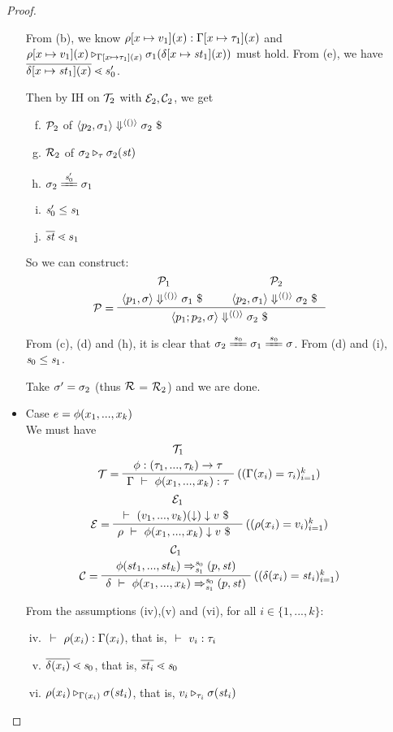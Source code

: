 \begin{proof}
\begin{itemize}
From (b), we know $\rho[x \mapsto v_1](x) : \Gamma[x \mapsto \tau_1](x)$ and  $\rho[x \mapsto v_1](x) \triangleright_{\Gamma[x \mapsto \tau_1](x)} \sigma_1(\delta[x \mapsto \mathit{st}_1](x))$ must hold. 
From (e), we have $\ol{\delta[\Map{x}{\st_1}](x)} \.< s_0'$. 

Then by IH on  $\mathcal{T}_2$ with $\mathcal{E}_2,\mathcal{C}_2$, we get
\begin{enumerate}	[(a)]
	\setcounter{enumi}{5}
	\item $\mathcal{P}_2$ of $\seval{p_2}{\sgm_1}{\vunit}{\sgm_2}$ 
	\item $\mathcal{R}_2$ of $ \sigma_2 \triangleright_{\tau} \sigma_2(\mathit{st})$
	\item $\sgm_2 \ConEq{\s_0'} \sgm_1$
	\item $\mathit{s}_0' \le \mathit{s}_1$
	\item $\ol{\st} \.< {s_1}$
\end{enumerate}

So we can construct:  
$$\PT{
	\UCN{\MP_1}{\seval{p_1}{\sgm}{\vunit}{\sgm_1}}
	\UCN{\MP_2}{\seval{p_2}{\sgm_1}{\vunit}{\sgm_2}}
	\LeLa{\MP = }	
	\BC{\seval{p_1;p_2}{\sgm}{\vunit}{\sgm_2}}
}$$

From (c), (d) and (h), it is clear that $\sgm_2 \ConEq{s_0} \sgm_1 \ConEq{s_0} \sgm$.
From (d) and (i), $\mathit{s}_0 \le \mathit{s}_1$.

Take $\sigma' = \sigma_2$ (thus $\mathcal{R}$ = $\mathcal{R}_2$)  and we are done. 


\item Case $e = \phi(x_1,...,x_k)$ \\
We must have  
$$\PT{
	\UCN{\MT_1}{\Typef {\hcall} {\replc{k}{\tau}} {\tau}}
	\LeLa{\MT = }
	\RiLa{((\Gam(x_i)= \tau_i)^k_{i=1})}
	\UC{\Type{\Gam}{\hcall{\Tupk{x}}}{\tau}}
}$$
$$\PT{
	\UCN{\ME_1}{\Eval{}{\EvalF{\Tupk{v}}}{v}}
	\LeLa{\ME = }
	\RiLa{((\rho(x_i)=v_i)^k_{i=1})}
	\UC{\Eval{\rho}{\hcall{\Tupk{x}}}{v}}
}$$
$$\PT{
	\UCN{\MC_1}{\Transf{\hcall}{\replc{k}{st}}{\s_0}{\s_1}{\sfun{p}{\st}}}
	\LeLa{\MC =}
	\RiLa{((\del(x_i)=\st_i)^k_{i=1})}
	\UC{\Trans{\del}{\hcall \Tupk{x}}{\s_0}{\s_1}{\sfun{p}{\st}}}
}$$

From the assumptions (iv),(v) and (vi), for all $i \in \{1,...,k\}$:
\begin{enumerate}[(i)]
	\setcounter{enumi}{3}
	\item $\ \vdash\  \rho(x_i) : \Gamma(x_i)$, that is, $\ \vdash\  v_i : \tau_i$
	\item $\ol{\del(x_i)} \.< \s_0$, that is, $\ol{\st_i} \.< \s_0$
	\item $\rho(x_i) \triangleright_{\Gamma(x_i)} \sigma(\mathit{st}_i)$, that is,
	$v_i \triangleright_{\tau_i} \sigma(\mathit{st}_i)$
\end{enumerate}


\end{itemize}
\end{proof}
